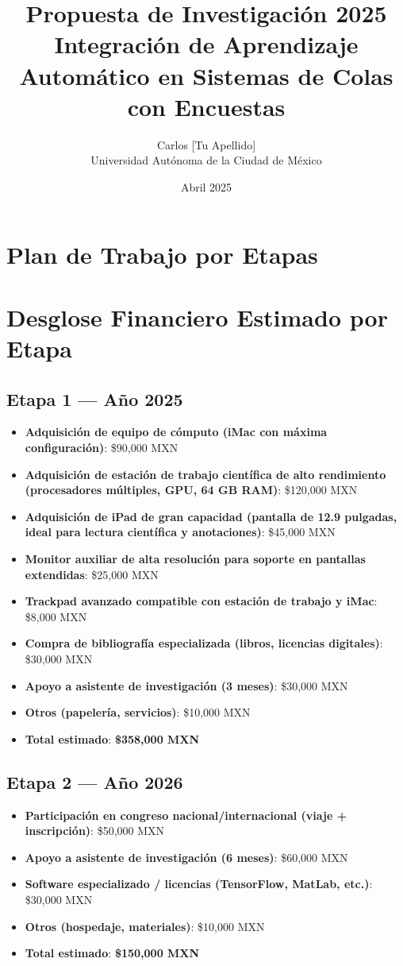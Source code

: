 \documentclass[12pt]{article}
\title{Propuesta de Investigación 2025\\Integración de Aprendizaje Automático en Sistemas de Colas con Encuestas}
\author{Carlos [Tu Apellido]\\Universidad Autónoma de la Ciudad de México}
\date{Abril 2025}
\begin{document}
\maketitle


\section*{Plan de Trabajo por Etapas}


\section*{Desglose Financiero Estimado por Etapa}

\subsection*{Etapa 1 — Año 2025}
\begin{itemize}
  \item \textbf{Adquisición de equipo de cómputo (iMac con máxima configuración)}: \$90,000 MXN
  \item \textbf{Adquisición de estación de trabajo científica de alto rendimiento (procesadores múltiples, GPU, 64 GB RAM)}: \$120,000 MXN
  \item \textbf{Adquisición de iPad de gran capacidad (pantalla de 12.9 pulgadas, ideal para lectura científica y anotaciones)}: \$45,000 MXN
  \item \textbf{Monitor auxiliar de alta resolución para soporte en pantallas extendidas}: \$25,000 MXN
  \item \textbf{Trackpad avanzado compatible con estación de trabajo y iMac}: \$8,000 MXN
  \item \textbf{Compra de bibliografía especializada (libros, licencias digitales)}: \$30,000 MXN
  \item \textbf{Apoyo a asistente de investigación (3 meses)}: \$30,000 MXN
  \item \textbf{Otros (papelería, servicios)}: \$10,000 MXN
  \item \textbf{Total estimado}: \textbf{\$358,000 MXN}
\end{itemize}

\subsection*{Etapa 2 — Año 2026}
\begin{itemize}
  \item \textbf{Participación en congreso nacional/internacional (viaje + inscripción)}: \$50,000 MXN
  \item \textbf{Apoyo a asistente de investigación (6 meses)}: \$60,000 MXN
  \item \textbf{Software especializado / licencias (TensorFlow, MatLab, etc.)}: \$30,000 MXN
  \item \textbf{Otros (hospedaje, materiales)}: \$10,000 MXN
  \item \textbf{Total estimado}: \textbf{\$150,000 MXN}
\end{itemize}
\end{document}
